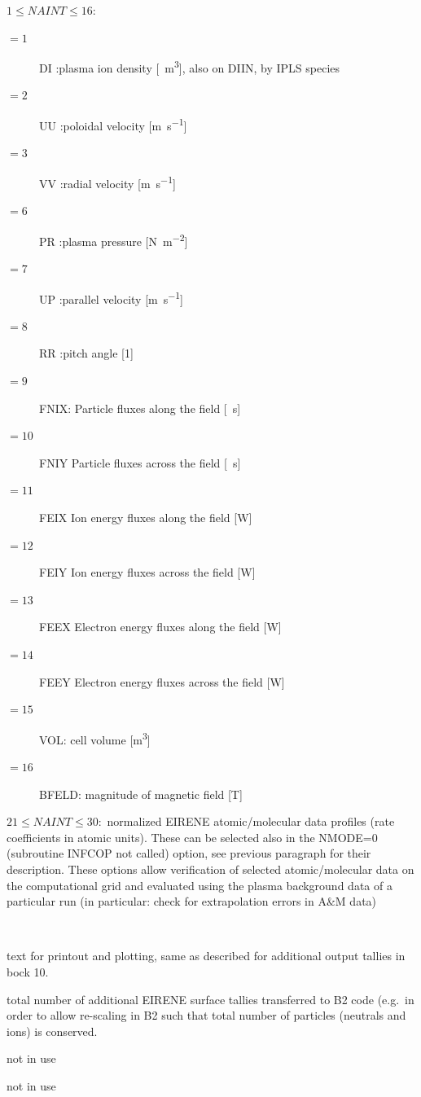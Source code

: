 \begin{description}
        $1 \le NAINT \le 16 :$
        \begin{description}
          \item[$= 1$] DI :plasma ion density
                  [\si{\per\cubic\metre}], also on DIIN, by IPLS species
          \item[$= 2$] UU
                :poloidal velocity [\si{\metre\per\second}]
          \item[$= 3$] VV :radial velocity
                  [\si{\metre\per\second}]
          \item[$= 6$] PR :plasma pressure
                  [\si{\newton\per\square\metre}]
          \item[$= 7$] UP :parallel velocity
                  [\si{\metre\per\second}]
          \item[$= 8$] RR :pitch angle [\num{1}]
          \item[$= 9$]
                FNIX: Particle fluxes along the field [\si{\per\second}]
          \item[$= 10$] FNIY
                Particle fluxes across the field [\si{\per\second}]
          \item[$= 11$] FEIX Ion
                energy fluxes along the field [\si{\watt}]
          \item[$= 12$] FEIY Ion energy fluxes
                across the field [\si{\watt}]
          \item[$= 13$] FEEX Electron energy fluxes along
                the field [\si{\watt}]
          \item[$= 14$] FEEY Electron energy fluxes across the
                field [\si{\watt}]
          \item[$= 15$] VOL: cell volume [\si{\cubic\metre}]
          \item[$=
                  16$] BFELD: magnitude of magnetic field [\si{\tesla}]
        \end{description}

        $21 \le NAINT \le 30 :$ normalized EIRENE atomic/molecular data profiles (rate
        coefficients in atomic units).
        These can be selected also in the NMODE=0 (subroutine INFCOP not called)
        option, see previous paragraph for their description.
        These options allow verification of selected atomic/molecular data on the
        computational grid and evaluated using the plasma background data of a
        particular run (in particular: check for extrapolation errors in A$\&$M data)

  \item[TXTPLS, TXTPSP, TXTPUN]~ 

        text for printout and plotting, same as described for additional output tallies
        in bock 10.
  \item[NAOTB] total number of additional EIRENE surface tallies transferred to
        B2 code (e.g.\ in order to allow re-scaling in B2 such that total number of
        particles (neutrals and ions) is conserved.
  \item[NAOTS] not in use
  \item[NAOTT] not in use
\end{description}

